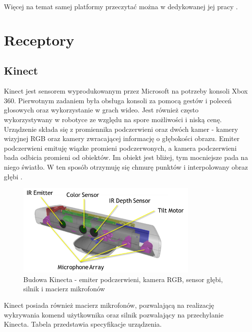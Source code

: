 Więcej na temat samej platformy przeczytać można w dedykowanej jej pracy \cite{omnivelma}.


\section{Receptory}

\subsection{Kinect}

Kinect jest sensorem wyprodukowanym przez Microsoft na potrzeby konsoli Xbox 360. Pierwotnym zadaniem była obsługa konsoli za pomocą gestów i poleceń głosowych oraz wykorzystanie w grach wideo. Jest również często wykorzystywany w robotyce ze względu na spore możliwości i niską cenę. Urządzenie składa się z promiennika podczerwieni oraz dwóch kamer - kamery wizyjnej RGB oraz kamery zwracającej informację o głębokości obrazu. Emiter podczerwieni emituję wiązke promieni podczerwonych, a kamera podczerwieni bada odbicia promieni od obiektów. Im obiekt jest bliżej, tym mocniejsze pada na niego światło. W ten sposób otrzymuję się chmurę punktów i interpolowany obraz głębi \cite{kinect}.

\begin{figure}[H]
	\centering
	\includegraphics[width=0.8\textwidth]{gfx/kinect2.png}
	\caption{Budowa Kinecta - emiter podczerwieni, kamera RGB, sensor głębi, silnik i macierz mikrofonów \cite{kinect}}
	\label{fig:kinect}
\end{figure}

Kinect posiada również macierz mikrofonów, pozwalającą na realizację wykrywania komend użytkownika oraz silnik pozwalający na przechylanie Kinecta. Tabela przedstawia specyfikacje urządzenia.

